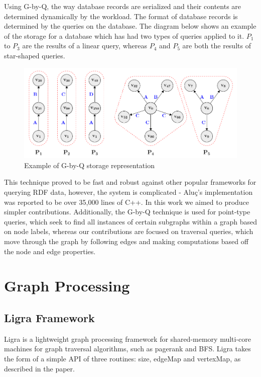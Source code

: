 Using G-by-Q, the way database records are serialized and their contents are determined dynamically by the workload. The format of database records is determined by the queries on the database. The diagram below shows an example of the storage for a database which has had two types of queries applied to it. $P_{1}$ to $P_{3}$ are the results of a linear query, whereas $P_{4}$ and $P_{5}$ are both the results of star-shaped queries.

\begin{figure}[h]
  \includegraphics[width=\textwidth]{images/g_by_q_img}
  \caption{Example of G-by-Q storage representation}
  \label{fig:g_by_q_img}
\end{figure}

This technique proved to be fast and robust against other popular frameworks for querying RDF data, however, the system is complicated - Aluç's implementation was reported to be over 35,000 lines of C++. In this work we aimed to produce simpler contributions. Additionally, the G-by-Q technique is used for point-type queries, which seek to find all instances of certain subgraphs within a graph based on node labels, whereas our contributions are focused on traversal queries, which move through the graph by following edges and making computations based off the node and edge properties.

\section{Graph Processing}

\subsection{Ligra Framework}

Ligra \cite{shun2013ligra} is a lightweight graph processing framework for shared-memory multi-core machines for graph traversal algorithms, such as pagerank and BFS. Ligra takes the form of a simple API of three routines: size, edgeMap and vertexMap, as described in the paper.

